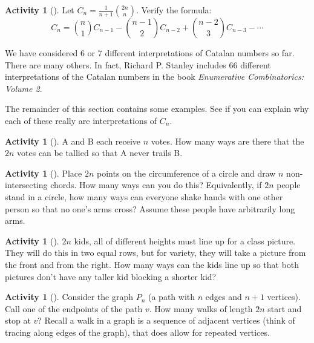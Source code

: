 \documentclass[10pt,]{book}
\theoremstyle{plain}
\theoremstyle{definition}
\theoremstyle{definition}
\theoremstyle{definition}
\newtheorem{activity}[project]{Activity}
\numberwithin{equation}{chapter}
\begin{document}
\begin{activity}[]\label{activity-126}
\hypertarget{p-629}{}%
Let \(C_{n} = \frac{1}{n + 1}\binom{2n}{n}\). Verify the formula:%
\begin{equation*}
C_{n} = \binom{n}{1} C_{n - 1} - \binom{n - 1}{2} C_{n - 2} + \binom{n - 2}{3} C_{n - 3} - \cdots
\end{equation*}
%
\end{activity}
\hypertarget{p-630}{}%
We have considered 6 or 7 different interpretations of Catalan numbers so far.  There are many others.  In fact, Richard P. Stanley includes 66 different interpretations of the Catalan numbers in the book \emph{Enumerative Combinatorics: Volume 2}.%
\par
\hypertarget{p-631}{}%
The remainder of this section contains some examples.  See if you can explain why each of these really are interpretations of \(C_n\).%
\begin{activity}[]\label{activity-127}
\hypertarget{p-632}{}%
A and B each receive \(n\) votes. How many ways are there that the \(2n\) votes can be tallied so that A never trails B.%
\end{activity}
\begin{activity}[]\label{activity-128}
\hypertarget{p-633}{}%
Place \(2n\) points on the circumference of a circle and draw \(n\)  non-intersecting chords.  How many ways can you do this?  Equivalently, if \(2n\) people stand in a circle, how many ways can everyone shake hands with one other person so that no one's arms cross?  Assume these people have arbitrarily long arms.%
\end{activity}
\begin{activity}[]\label{activity-129}
\hypertarget{p-635}{}%
\(2n\) kids, all of different heights must line up for a class picture.  They will do this in two equal rows, but for variety, they will take a picture from the front and from the right.  How many ways can the kids line up so that both pictures don't have any taller kid blocking a shorter kid?%
\end{activity}
\begin{activity}[]\label{activity-130}
\hypertarget{p-636}{}%
Consider the graph \(P_n\) (a path with \(n\) edges and \(n+1\) vertices).  Call one of the endpoints of the path \(v\).  How many walks of length \(2n\) start and stop at \(v\)?  Recall a walk in a graph is a sequence of adjacent vertices (think of tracing along edges of the graph), that does allow for repeated vertices.%
\end{activity}
\end{document}

